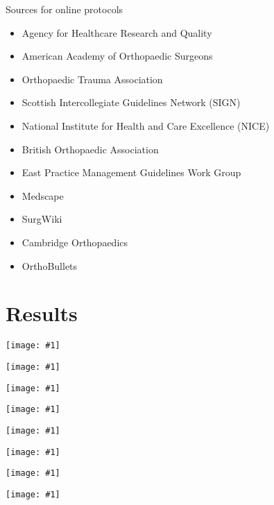 \documentclass{beamer}
\newcommand*{\solo}[1]{\centering\texttt{[image: \#1]}}
\begin{document}
\begin{frame}{Sources for online protocols}
    \begin{itemize}
        \item Agency for Healthcare Research and Quality
        \item American Academy of Orthopaedic Surgeons
        \item Orthopaedic Trauma Association
        \item Scottish Intercollegiate Guidelines Network (SIGN)
        \item National Institute for Health and Care Excellence (NICE)
        \item British Orthopaedic Association
        \item East Practice Management Guidelines Work Group
        \item Medscape
        \item SurgWiki
        \item Cambridge Orthopaedics
        \item OrthoBullets
    \end{itemize}
\end{frame}

\section{Results}
\begin{frame}
    \solo{F1.jpg}
\end{frame}

\begin{frame}
    \solo{T1.pdf}
\end{frame}

\begin{frame}
    \solo{T2.pdf}
\end{frame}

\begin{frame}
    \solo{T3.pdf}
\end{frame}

\begin{frame}
    \solo{T4.pdf}
\end{frame}

\begin{frame}
    \solo{T5.pdf}
\end{frame}

\begin{frame}
    \solo{T6.pdf}
\end{frame}

\begin{frame}
    \solo{E1.pdf}
\end{frame}
\end{document}
